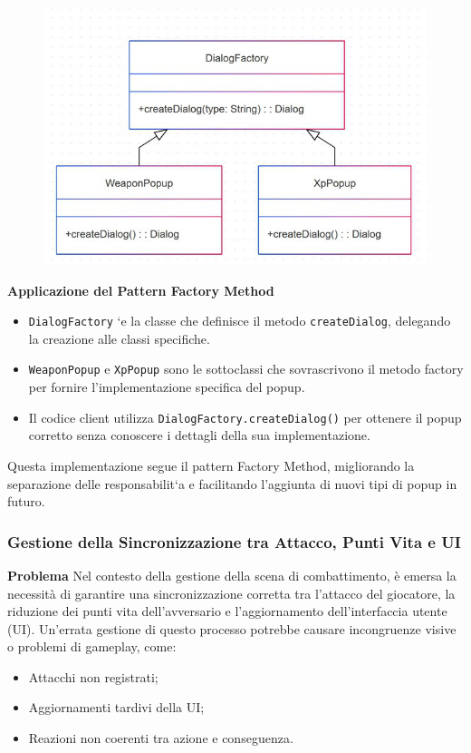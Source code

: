 \documentclass[a4paper,12pt]{report}
\begin{document}
\begin{figure}[H]
	\includegraphics[scale=0.8]{img/montanariDialog.png}
\end{figure}

\textbf{Applicazione del Pattern Factory Method}\
\begin{itemize}
\item \texttt{DialogFactory} `e la classe che definisce il metodo \texttt{createDialog}, delegando la creazione alle classi specifiche.
\item \texttt{WeaponPopup} e \texttt{XpPopup} sono le sottoclassi che sovrascrivono il metodo factory per fornire l’implementazione specifica del popup.
\item Il codice client utilizza \texttt{DialogFactory.createDialog()} per ottenere il popup corretto senza conoscere i dettagli della sua implementazione.
\end{itemize}

Questa implementazione segue il pattern Factory Method, migliorando la separazione delle responsabilit`a e facilitando l’aggiunta di nuovi tipi di popup in futuro.

\subsubsection{Gestione della Sincronizzazione tra Attacco, Punti Vita e UI}

\textbf{Problema}
Nel contesto della gestione della scena di combattimento, è emersa la necessità di garantire una sincronizzazione corretta tra l'attacco del giocatore, la riduzione dei punti vita dell'avversario e l'aggiornamento dell'interfaccia utente (UI). Un’errata gestione di questo processo potrebbe causare incongruenze visive o problemi di gameplay, come:
\begin{itemize}
    \item Attacchi non registrati;
    \item Aggiornamenti tardivi della UI;
    \item Reazioni non coerenti tra azione e conseguenza.
\end{itemize}
\end{document}
